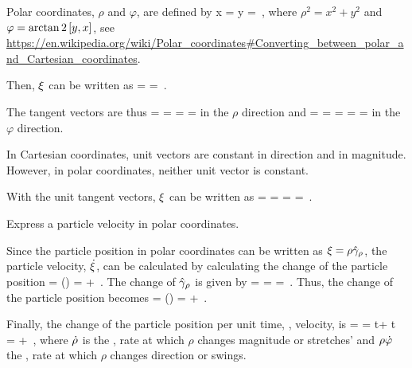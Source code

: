 \begin{solution}
Polar coordinates, $\rho$ and $\varphi$, are defined by
\beq
x = \rho\cos\vat\varphi\qquad{}\qquad
y = \rho\sin\vat\varphi\,,
\eeq
where $\rho^2 = x^2 + y^2$ and $\varphi = \arctan2\left[{y,x}\right]$, see \url{https://en.wikipedia.org/wiki/Polar_coordinates#Converting_between_polar_and_Cartesian_coordinates}.

Then, $\xi$ can be written as
\beq
\pos =  = \rho\tuple{\cos\vat\varphi, \sin\vat\varphi}\,.
\eeq

The tangent vectors are thus
\beq
\fbvec\rho = \xpd{\pos}{\rho} 
           = \tuple{\cos\vat\varphi, \sin\vat\varphi}
\implies
\ufbvec\rho = \dfrac{\fbvec\rho}{\magn{\fbvec\rho}} 
            = \tuple{\cos\vat\varphi, \sin\vat\varphi}
\eeq
in the $\rho$ direction and
\beq
\fbvec\varphi = \xpd{\pos}{\varphi} 
              = \rho\tuple{-\sin\vat\varphi, \cos\vat\varphi}
\implies
\ufbvec\varphi = \dfrac{\fbvec\varphi}{\magn{\fbvec\varphi}} 
               = \dfrac{\fbvec\varphi}{\rho}
               = \tuple{-\sin\vat\varphi, \cos\vat\varphi}
\eeq
in the $\varphi$ direction.

In Cartesian coordinates, unit vectors are constant in direction and in magnitude. However, in polar coordinates, neither unit vector is constant.

With the unit tangent vectors, $\xi$ can be written as
\beq
\pos =  
     = \tuple{\rho\cos\vat\varphi, \rho\sin\vat\varphi}
     = \rho\tuple{\cos\vat\varphi, \sin\vat\varphi}
     = \rho\ufbvec\rho\,.\mqed
\eeq
\end{solution}


\begin{example}
Express a particle velocity in polar coordinates.
\end{example}

\begin{solution}
Since the particle position in polar coordinates can be written as $\xi = \rho\hat{\gamma}_{\rho}$, the particle velocity, $\dot{\xi}$, can be calculated by calculating the change of the particle position
\beq
\dx\pos = \dx\left(\rho\ufbvec\rho\right)
        = \dx\rho\ufbvec\rho + \rho\dx\ufbvec\rho\,.
\eeq
The change of $\hat{\gamma}_{\rho}$ is given by
\beq
\dx\ufbvec\rho = \tuple{-\sin\vat\varphi\,\dx\varphi, \cos\vat\varphi\,\dx\varphi}
               = \dx\varphi\tuple{-\sin\vat\varphi, \cos\vat\varphi}
               = \dx\varphi\ufbvec\varphi\,.
\eeq
Thus, the change of the particle position becomes
\beq
\dx\pos = \dx\left(\rho\ufbvec\rho\right)
        = \dx\rho\ufbvec\rho + \rho\dx\varphi\ufbvec\varphi\,.
\eeq

Finally, the change of the particle position per unit time, \ie, velocity, is
\beq
\dt\pos =  
        = \xod\rho t\ufbvec\rho + \rho\xod\varphi t\ufbvec\varphi
        = \dt\rho\ufbvec\rho + \rho\dt\varphi\ufbvec\varphi\,,
\eeq
where $\dot{\rho}$ is the , rate at which $\rho$ changes magnitude or stretches' and $\rho\dot{\varphi}$ the , rate at which $\rho$ changes direction or swings.
\end{solution}
